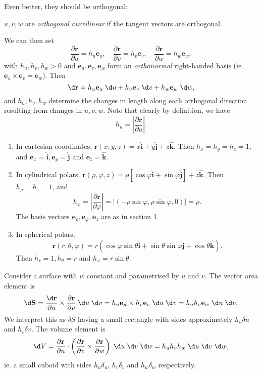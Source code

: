 \documentclass[a4paper]{article}
\begin{document}
Even better, they should be orthogonal:
\begin{defi}
  $u, v, w$ are \emph{orthogonal curvilinear} if the tangent vectors are orthogonal.
\end{defi}
We can then set
\[
  \frac{\partial \mathbf{r}}{\partial u} = h_u \mathbf{e}_u, \quad \frac{\partial \mathbf{r}}{\partial v} = h_v \mathbf{e}_v,\quad \frac{\partial \mathbf{r}}{\partial w} = h_w \mathbf{e}_w,
\]
with $h_u, h_v, h_w > 0$ and $\mathbf{e}_u, \mathbf{e}_v, \mathbf{e}_w$ form an \emph{orthonormal} right-handed basis (ie. $\mathbf{e}_u \times \mathbf{e}_v = \mathbf{e}_w$). Then
\[
  \d \mathbf{r} = h_u \mathbf{e}_u \;\d u + h_v \mathbf{e}_v\;\d v + h_w\mathbf{e}_w \;\d w,
\]
and $h_u, h_v, h_w$ determine the changes in length along each orthogonal direction resulting from changes in $u, v, w$. Note that clearly by definition, we have
\[
  h_u = \left|\frac{\partial \mathbf{r}}{\partial u}\right|.
\]
\begin{eg}\leavevmode
  \begin{enumerate}
    \item In cartesian coordinates, $\mathbf{r}(x, y, z) = x\hat{\mathbf{i}} + y\hat{\mathbf{j}} + z\hat{\mathbf{k}}$. Then $h_x = h_y = h_z = 1$, and $\mathbf{e}_x = \hat{\mathbf{i}}, \mathbf{e}_y = \hat{\mathbf{j}}$ and $\mathbf{e}_z = \hat{\mathbf{k}}$.
    \item In cylindrical polars, $\mathbf{r}(\rho, \varphi, z) = \rho[\cos \varphi\hat{\mathbf{i}} + \sin \varphi \hat{\mathbf{j}}] + z \hat{\mathbf{k}}$. Then $h_\rho = h_z = 1$, and
      \[
        h_\varphi = \left|\frac{\partial \mathbf{r}}{\partial \varphi}\right| = |(-\rho \sin\varphi, \rho \sin \varphi, 0)| = \rho.
      \]
      The basis vectors $\mathbf{e}_\rho, \mathbf{e}_\varphi, \mathbf{e}_z$ are as in section 1.
    \item In spherical polars,
      \[
        \mathbf{r}(r, \theta, \varphi) = r(\cos \varphi\sin \theta\hat{\mathbf{i}} + \sin \theta\sin \varphi\hat{\mathbf{j}} + \cos \theta \hat{\mathbf{k}}).
      \]
      Then $h_r = 1, h_\theta = r$ and $h_\varphi = r\sin \theta$.
  \end{enumerate}
\end{eg}

Consider a surface with $w$ constant and parametrised by $u$ and $v$. The vector area element is
\[
  \d \mathbf{S} = \frac{\d \mathbf{r}}{\partial u}\times \frac{\partial \mathbf{r}}{\partial v}\;\d u\;\d v = h_u \mathbf{e}_u \times h_v \mathbf{e}_v \;\d u\;\d v = h_uh_v \mathbf{e}_w \;\d u\;\d v.
\]
We interpret this as $\delta S$ having a small rectangle with sides approximately $h_u \delta u$ and $h_v \delta v$. The volume element is
\[
  \d V = \frac{\partial \mathbf{r}}{\partial u}\cdot \left(\frac{\partial \mathbf{r}}{\partial v}\times \frac{\partial \mathbf{r}}{\partial w}\right)\;\d u\;\d v\;\d w = h_uh_vh_w \;\d u\;\d v\;\d w,
\]
ie. a small cuboid with sides $h_u \delta _u$, $h_v\delta _v$ and $h_w \delta_w$ respectively.
\end{document}
